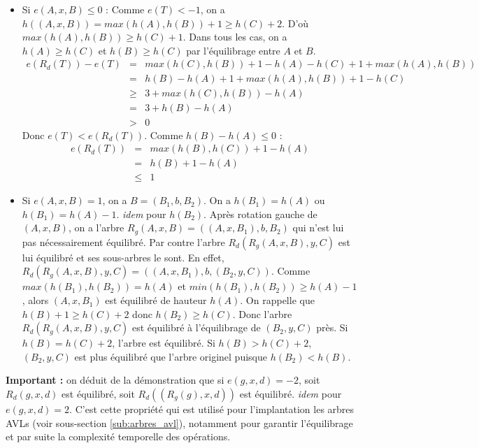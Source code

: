 \documentclass[../../../main.tex]{subfiles}
\begin{document}
\begin{itemize}
	\item Si $e(A, x, B) \leq 0$ :\newline
	Comme $e(T) < -1$, on a $h((A, x, B)) = max(h(A), h(B)) + 1\geq h(C) + 2$. \newline
D'où $max(h(A), h(B)) \geq h(C) + 1$. Dans tous les cas, on a $h(A)\geq h(C)$ et $h(B)\geq h(C)$ par l'équilibrage entre $A$ et $B$.
$$\begin{array}{lcl}
e(R_d(T)) - e(T) & = & max(h(C), h(B)) + 1 - h(A) - h(C) + 1 + max(h(A), h(B)) \\ 
& = & h(B) - h(A) + 1 + max(h(A), h(B)) + 1 - h(C) \\
& \geq & 3 + max(h(C), h(B)) - h(A) \\
& = & 3 + h(B) - h(A)\\ 
& > & 0
\end{array}$$
Donc $e(T) < e(R_d(T))$. Comme $h(B) - h(A) \leq 0$ :
$$\begin{array}{lcl}
e(R_d(T)) & = & max(h(B), h(C)) + 1 - h(A)\\
& = & h(B) + 1 - h(A) \\
& \leq & 1
\end{array}$$
	\item Si $e(A, x, B) = 1$, on a $B = (B_1, b, B_2)$. On a $h(B_1) = h(A)$ ou $h(B_1) = h(A) - 1$. \textit{idem} pour $h(B_2)$. Après rotation gauche de $(A, x, B)$, on a l'arbre $R_g(A, x, B) = ((A, x, B_1), b, B_2)$ qui n'est lui pas nécessairement équilibré. Par contre l'arbre $R_d(R_g(A, x, B), y, C)$ est lui équilibré et ses sous-arbres le sont. \newline
	En effet, $R_d(R_g(A, x, B), y, C) = ((A, x, B_1), b, (B_2, y, C))$. Comme $max(h(B_1), h(B_2)) = h(A)$ et $min(h(B_1), h(B_2)) \geq h(A)-1$, alors $(A, x, B_1)$ est équilibré de hauteur $h(A)$. On rappelle que $h(B) + 1\geq h(C) + 2$ donc $h(B_2)\geq h(C)$. Donc l'arbre $R_d(R_g(A, x, B), y, C)$ est équilibré à l'équilibrage de $(B_2, y, C)$ près. Si $h(B) = h(C) + 2$, l'arbre est équilibré. Si $h(B) > h(C) + 2$, $(B_2, y, C)$ est plus équilibré que l'arbre originel puisque $h(B_2) < h(B)$.
\end{itemize}
\textbf{Important :} on déduit de la démonstration que si $e(g, x, d) = -2$, soit $R_d(g, x, d)$ est équilibré, soit $R_d((R_g(g), x, d))$ est équilibré. \textit{idem} pour $e(g, x, d) = 2$. C'est cette propriété qui est utilisé pour l'implantation les arbres AVLs (voir sous-section \ref{sub:arbres_avl}), notamment pour garantir l'équilibrage et par suite la complexité temporelle des opérations.
\end{document}
